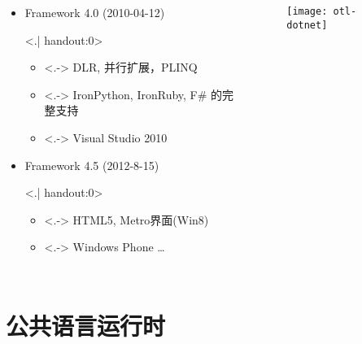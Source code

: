 \begin{frame}[t]
\begin{columns}[t]
\begin{itemize}[<+->]
\item Framework 4.0 (2010-04-12)

\only<.| handout:0>{
\begin{itemize}
\item<.-> DLR, 并行扩展，PLINQ
\item<.-> IronPython, IronRuby, F\# 的完整支持
\item<.-> Visual Studio 2010
\end{itemize}}

\item Framework 4.5 (2012-8-15)

\only<.| handout:0>{
\begin{itemize}
\item<.-> HTML5, Metro界面(Win8)
\item<.-> Windows Phone \ldots
\end{itemize}}
\end{itemize}

\begin{figure}
\centerline{\texttt{[image: otl-dotnet]}}
\end{figure}
\end{columns}
\end{frame}


\section{公共语言运行时}

